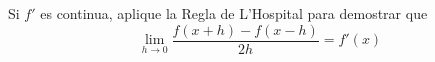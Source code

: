 \item Si $f'$ es continua, aplique la Regla de L'Hospital para demostrar que
    $$\lim_{h \to 0} \frac{f(x+h) - f(x-h)}{2h} = f'(x)$$
